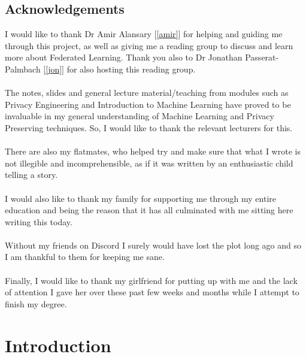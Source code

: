 \documentclass[12pt,twoside]{report}
\begin{document}
\section*{Acknowledgements}
I would like to thank Dr Amir Alansary [\ref{amir}] for helping and guiding me through this project, as well as giving me a reading group to discuss and learn more about Federated Learning. 
Thank you also to Dr Jonathan Passerat-Palmbach [\ref{jon}] for also hosting this reading group.
\\ \\
The notes, slides and general lecture material/teaching from modules such as Privacy Engineering and Introduction to Machine Learning have proved to be invaluable in my general understanding of Machine Learning and Privacy Preserving techniques. So, I would like to thank the relevant lecturers for this.
\\ \\
There are also my flatmates, who helped try and make sure that what I wrote is not illegible and incomprehensible, as if it was written by an enthusiastic child telling a story.
\\ \\
I would also like to thank my family for supporting me through my entire education and being the reason that it has all culminated with me sitting here writing this today.
\\ \\
Without my friends on Discord I surely would have lost the plot long ago and so I am thankful to them for keeping me sane.
\\ \\
Finally, I would like to thank my girlfriend for putting up with me and the lack of attention I gave her over these past few weeks and months while I attempt to finish my degree.

\clearpage{\pagestyle{empty}}

\tableofcontents 


\clearpage{\pagestyle{empty}}
\setcounter{page}{1}
\fancyhead[LE,RO]{\slshape \rightmark}
\fancyhead[LO,RE]{\slshape \leftmark}

\chapter{Introduction}

\end{document}
